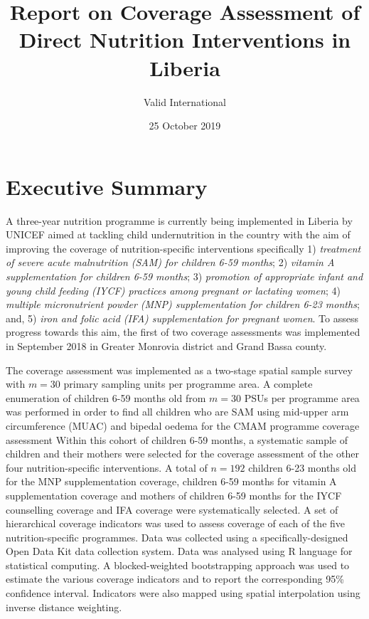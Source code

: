 \documentclass[12pt,a4paper]{article}
\title{\vspace{3.5in}Report on Coverage Assessment of Direct Nutrition Interventions in Liberia}
\author{Valid International}
\date{25 October 2019}
\begin{document}
\maketitle

\newpage

{
\hypersetup{linkcolor=black}
\setcounter{tocdepth}{3}
\tableofcontents
}
\listoftables
\listoffigures
\newpage

\hypertarget{executive-summary}{%
\section{Executive Summary}\label{executive-summary}}

A three-year nutrition programme is currently being implemented in Liberia by UNICEF aimed at tackling child undernutrition in the country with the aim of improving the coverage of nutrition-specific interventions specifically 1) \emph{treatment of severe acute malnutrition (SAM) for children 6-59 months}; 2) \emph{vitamin A supplementation for children 6-59 months}; 3) \emph{promotion of appropriate infant and young child feeding (IYCF) practices among pregnant or lactating women}; 4) \emph{multiple micronutrient powder (MNP) supplementation for children 6-23 months}; and, 5) \emph{iron and folic acid (IFA) supplementation for pregnant women}. To assess progress towards this aim, the first of two coverage assessments was implemented in September 2018 in Greater Monrovia district and Grand Bassa county.

The coverage assessment was implemented as a two-stage spatial sample survey with \(m = 30\) primary sampling units per programme area. A complete enumeration of children 6-59 months old from \(m = 30\) PSUs per programme area was performed in order to find all children who are SAM using mid-upper arm circumference (MUAC) and bipedal oedema for the CMAM programme coverage assessment Within this cohort of children 6-59 months, a systematic sample of children and their mothers were selected for the coverage assessment of the other four nutrition-specific interventions. A total of \(n = 192\) children 6-23 months old for the MNP supplementation coverage, children 6-59 months for vitamin A supplementation coverage and mothers of children 6-59 months for the IYCF counselling coverage and IFA coverage were systematically selected. A set of hierarchical coverage indicators was used to assess coverage of each of the five nutrition-specific programmes. Data was collected using a specifically-designed Open Data Kit data collection system. Data was analysed using R language for statistical computing. A blocked-weighted bootstrapping approach was used to estimate the various coverage indicators and to report the corresponding 95\% confidence interval. Indicators were also mapped using spatial interpolation using inverse distance weighting.
\end{document}
